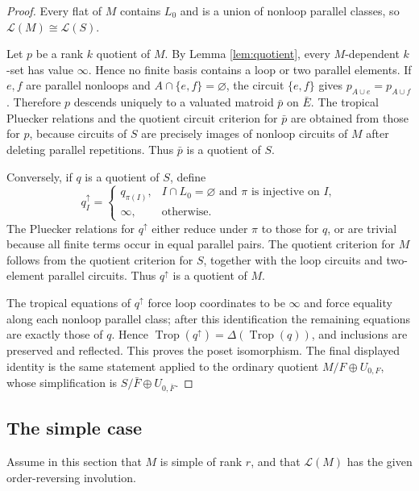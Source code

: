 \documentclass[12pt]{article}
\theoremstyle{definition}
\newcommand{\Trop}{\operatorname{Trop}}
\newcommand{\cL}{\mathcal L}
\begin{document}
\begin{proof}
Every flat of \(M\) contains \(L_0\) and is a union of nonloop parallel classes, so \(\cL(M)\cong\cL(S)\).

Let \(p\) be a rank \(k\) quotient of \(M\).  By Lemma \ref{lem:quotient}, every \(M\)-dependent \(k\)-set has value \(\infty\).  Hence no finite basis contains a loop or two parallel elements.  If \(e,f\) are parallel nonloops and \(A\cap\{e,f\}=\varnothing\), the circuit \(\{e,f\}\) gives \(p_{A\cup e}=p_{A\cup f}\).  Therefore \(p\) descends uniquely to a valuated matroid \(\bar p\) on \(\bar E\).  The tropical Pluecker relations and the quotient circuit criterion for \(\bar p\) are obtained from those for \(p\), because circuits of \(S\) are precisely images of nonloop circuits of \(M\) after deleting parallel repetitions.  Thus \(\bar p\) is a quotient of \(S\).

Conversely, if \(q\) is a quotient of \(S\), define
\[
q^\uparrow_I=
\begin{cases}
q_{\pi(I)},& I\cap L_0=\varnothing\text{ and }\pi\text{ is injective on }I,\\
\infty,&\text{otherwise}.
\end{cases}
\]
The Pluecker relations for \(q^\uparrow\) either reduce under \(\pi\) to those for \(q\), or are trivial because all finite terms occur in equal parallel pairs.  The quotient criterion for \(M\) follows from the quotient criterion for \(S\), together with the loop circuits and two-element parallel circuits.  Thus \(q^\uparrow\) is a quotient of \(M\).

The tropical equations of \(q^\uparrow\) force loop coordinates to be \(\infty\) and force equality along each nonloop parallel class; after this identification the remaining equations are exactly those of \(q\).  Hence \(\Trop(q^\uparrow)=\Delta(\Trop(q))\), and inclusions are preserved and reflected.  This proves the poset isomorphism.  The final displayed identity is the same statement applied to the ordinary quotient \(M/F\oplus U_{0,F}\), whose simplification is \(S/\bar F\oplus U_{0,\bar F}\).
\end{proof}

\subsection*{The simple case}

Assume in this section that \(M\) is simple of rank \(r\), and that \(\cL(M)\) has the given order-reversing involution.
\end{document}

